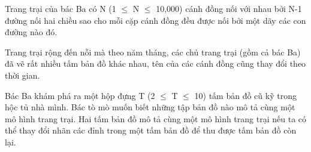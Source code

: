 Trang trại của bác Ba có N (1  $\le$  N  $\le$  10,000) cánh đồng nối với nhau bởi N-1 đường nối hai chiều sao cho mỗi cặp cánh đồng đều được nối bởi một dãy các con đường nào đó.  

   Trang trại rộng đến nỗi mà theo năm tháng, các chủ trang trại (gồm cả bác Ba) đã vẽ rất nhiều tấm bản đồ khác nhau, tên của các cánh đồng cũng thay đổi theo thời gian.  

   Bác Ba khám phá ra một hộp đựng T (2  $\le$  T  $\le$  10) tấm bản đồ cũ kỹ trong hộc tủ nhà mình. Bác tò mò muốn biết những tập bản đồ nào mô tả cùng một mô hình trang trại. Hai tấm bản đồ mô tả cùng một mô hình trang trại nếu ta có thể thay đổi nhãn các đỉnh trong một tấm bản đồ để thu được tấm bản đồ còn lại.  

\